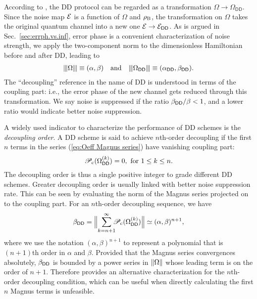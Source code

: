 \documentclass[pra,reprint,superscriptaddress]{revtex4-2}
\newcommand{\Odd}{\Omega_{\mathsf{DD}}}
\newcommand{\Pcp}{\mathscr{P}_{\mathrm{c}}}
\begin{document}
According to , the DD protocol can be regarded as a transformation $\Omega \to \Odd$. Since the noise map $\mathcal{E}$ is a function of $\Omega$ and $\rho_\mathrm{B}$, the transformation on $\Omega$ takes the original quantum channel into a new 
one  $\mathcal{E}\to\mathcal{E}_{\mathsf{DD}}$. 
As is argued in Sec.~\!\ref{sec:errph.vs.inf}, error phase is a convenient characterization of noise strength, we apply the two-component norm to the dimensionless Hamiltonian before and after DD, leading to 
\begin{align}
    \opnorm{\Omega} \equiv (\alpha,\beta) \quad \mathrm{and}\quad  \opnorm{\Odd} \equiv (\alpha_\sDD,\beta_\sDD).
\end{align}
The ``decoupling'' reference in the name of DD is understood in terms of the coupling part: i.e., the error phase of the new channel gets reduced through this transformation.
We say noise is suppressed if the ratio $\beta_{\mathsf{DD}}/\beta<1$, and a lower ratio would indicate better noise suppression.


A widely used indicator to characterize the performance of DD schemes is the \emph{decoupling order}. A DD scheme is said to achieve $n$th-order decoupling  if the first $n$ terms in the series (\ref{eq:Oeff Magnus series}) have vanishing coupling part:
\begin{equation}\label{dd:nth-order-condition}
\Pcp(\Omega_{\sDD}\up{k}) =0,\ \text{for } 1\le k \le n.  
\end{equation}
The decoupling order is thus a single positive integer to grade different DD schemes. Greater decoupling order is usually linked with better noise suppression rate. 
This can be seen by evaluating the norm of the Magnus series projected on to the coupling part. For an $n$th-order decoupling sequence, we have
\begin{equation}\label{eq:nth-order-alternative}
\beta_\sDD 
=\norm[\Big]{\sum_{ k=n+1}^\infty \!\!\! \Pcp(\Omega_{\sDD}\up{k}) }
\simeq (\alpha,\beta)^{n+1},
\end{equation}
where we use the notation $(\alpha,\beta)^{n+1}$ to represent a polynomial that is $(n+1)$th order in $\alpha$ and $\beta$.
Provided that the Magnus series convergences absolutely, $\beta_{\mathsf{DD}}$ is bounded by a power series in $\Vert {\Omega} \Vert$ whose leading term is on the order of $n+1$.
Therefore  provides an alternative characterization for the $n$th-order decoupling condition, which can be useful when directly calculating the first $n$ Magnus terms is unfeasible.
\end{document}

